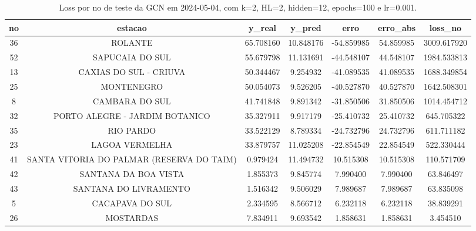 \begin{table}[h]
\centering
\caption{Loss por no de teste da GCN em 2024-05-04, com k=2, HL=2, hidden=12, epochs=100 e lr=0.001.}
\label{tab:gcn_loss_k2_hl2_h12_e100_d20240504}
\begin{tabular}{ccccccc}
\toprule
no & estacao & y\_real & y\_pred & erro & erro\_abs & loss\_no \\
\midrule
36 & ROLANTE & 65.708160 & 10.848176 & -54.859985 & 54.859985 & 3009.617920 \\
52 & SAPUCAIA DO SUL & 55.679798 & 11.131691 & -44.548107 & 44.548107 & 1984.533813 \\
13 & CAXIAS DO SUL - CRIUVA & 50.344467 & 9.254932 & -41.089535 & 41.089535 & 1688.349854 \\
25 & MONTENEGRO & 50.054073 & 9.526205 & -40.527870 & 40.527870 & 1642.508301 \\
8 & CAMBARA DO SUL & 41.741848 & 9.891342 & -31.850506 & 31.850506 & 1014.454712 \\
32 & PORTO ALEGRE - JARDIM BOTANICO & 35.327911 & 9.917179 & -25.410732 & 25.410732 & 645.705322 \\
35 & RIO PARDO & 33.522129 & 8.789334 & -24.732796 & 24.732796 & 611.711182 \\
23 & LAGOA VERMELHA & 33.879757 & 11.025208 & -22.854549 & 22.854549 & 522.330444 \\
41 & SANTA VITORIA DO PALMAR (RESERVA DO TAIM) & 0.979424 & 11.494732 & 10.515308 & 10.515308 & 110.571709 \\
42 & SANTANA DA BOA VISTA & 1.855373 & 9.845774 & 7.990400 & 7.990400 & 63.846497 \\
43 & SANTANA DO LIVRAMENTO & 1.516342 & 9.506029 & 7.989687 & 7.989687 & 63.835098 \\
5 & CACAPAVA DO SUL & 2.334595 & 8.566712 & 6.232118 & 6.232118 & 38.839291 \\
26 & MOSTARDAS & 7.834911 & 9.693542 & 1.858631 & 1.858631 & 3.454510 \\
\bottomrule
\end{tabular}
\end{table}
